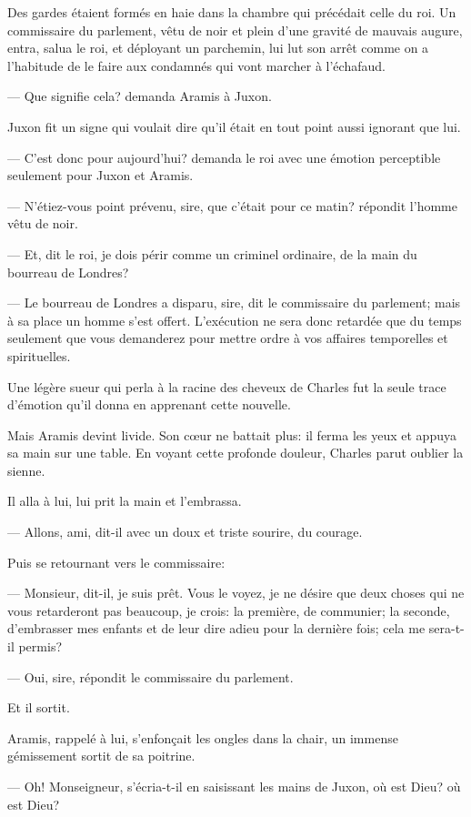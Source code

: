 Des gardes étaient formés en haie dans la chambre qui précédait celle du roi. Un commissaire du parlement, vêtu de noir et plein d'une gravité de mauvais augure, entra, salua le roi, et déployant un parchemin, lui lut son arrêt comme on a l'habitude de le faire aux condamnés qui vont marcher à l'échafaud.

— Que signifie cela? demanda Aramis à Juxon.

Juxon fit un signe qui voulait dire qu'il était en tout point aussi ignorant que lui.

— C'est donc pour aujourd'hui? demanda le roi avec une émotion perceptible seulement pour Juxon et Aramis.

— N'étiez-vous point prévenu, sire, que c'était pour ce matin? répondit l'homme vêtu de noir.

— Et, dit le roi, je dois périr comme un criminel ordinaire, de la main du bourreau de Londres?

— Le bourreau de Londres a disparu, sire, dit le commissaire du parlement; mais à sa place un homme s'est offert. L'exécution ne sera donc retardée que du temps seulement que vous demanderez pour mettre ordre à vos affaires temporelles et spirituelles.

Une légère sueur qui perla à la racine des cheveux de Charles fut la seule trace d'émotion qu'il donna en apprenant cette nouvelle.

Mais Aramis devint livide. Son cœur ne battait plus: il ferma les yeux et appuya sa main sur une table. En voyant cette profonde douleur, Charles parut oublier la sienne.

Il alla à lui, lui prit la main et l'embrassa.

— Allons, ami, dit-il avec un doux et triste sourire, du courage.

Puis se retournant vers le commissaire:

— Monsieur, dit-il, je suis prêt. Vous le voyez, je ne désire que deux choses qui ne vous retarderont pas beaucoup, je crois: la première, de communier; la seconde, d'embrasser mes enfants et de leur dire adieu pour la dernière fois; cela me sera-t-il permis?

— Oui, sire, répondit le commissaire du parlement.

Et il sortit.

Aramis, rappelé à lui, s'enfonçait les ongles dans la chair, un immense gémissement sortit de sa poitrine.

— Oh! Monseigneur, s'écria-t-il en saisissant les mains de Juxon, où est Dieu? où est Dieu?

